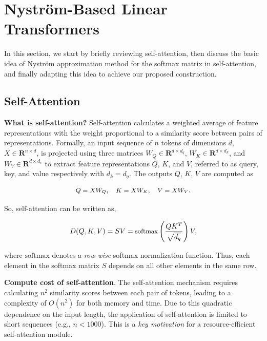 \section{Nystr\"{o}m-Based Linear Transformers}

In this section, we start by briefly reviewing self-attention, then discuss the basic idea of Nystr\"{o}m approximation method for the softmax matrix in self-attention, and finally adapting this idea to achieve our proposed construction.

\subsection{Self-Attention}
{\bf What is self-attention?} Self-attention calculates a weighted average of feature representations with the weight proportional to a similarity score between pairs of representations. Formally, an input sequence of $n$ tokens of dimensions $d$, $X \in \textbf{R}^{n\times d}$, is projected using three matrices $W_Q \in \textbf{R}^{d \times d_q}$, $W_K \in \textbf{R}^{d \times d_k}$, and $W_V \in \textbf{R}^{d\times d_v}$ to extract feature representations $Q$, $K$, and $V$, referred to as query, key, and value respectively with $d_k = d_q$. The outputs $Q$, $K$, $V$ are computed as

\begin{equation}
\small
\begin{split}
    Q  = XW_Q, \quad
    K  = XW_K, \quad
    V  = XW_V.
\end{split}
\end{equation}

So, self-attention can be written as,

\begin{equation}\label{eq:trueatten}
\small
     D(Q, K, V) = SV = \text{softmax}\left(\frac{QK^T}{\sqrt{d_q}}\right) V,
\end{equation}

where $\text{softmax}$ denotes a {\it row-wise} softmax normalization function. Thus, each element in the softmax matrix $S$ depends on all other elements in the same row.

\smallskip
 {\bf Compute cost of self-attention}. The self-attention mechanism requires calculating $n^2$ similarity scores between each pair of tokens, leading to a complexity of $O(n^2)$ for both memory and time. Due to this quadratic dependence on the input length, the application of self-attention is limited to short sequences (e.g., $n<1000$).  This is a 
{\it key motivation} for a resource-efficient self-attention module.


